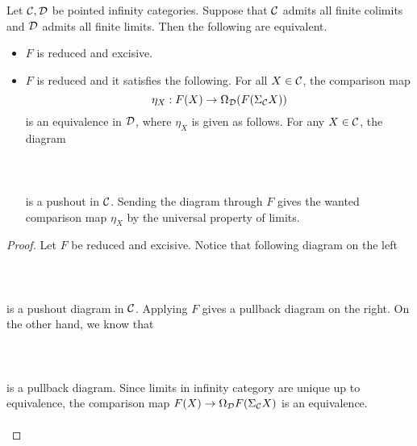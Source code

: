 \documentclass[a4paper]{article}
\begin{document}
\begin{prp}{}{} Let $\mathcal{C},\mathcal{D}$ be pointed infinity categories. Suppose that $\mathcal{C}$ admits all finite colimits and $\mathcal{D}$ admits all finite limits. Then the following are equivalent. 
\begin{itemize}
\item $F$ is reduced and excisive. 
\item $F$ is reduced and it satisfies the following. For all $X\in\mathcal{C}$, the comparison map $$\eta_X:F(X)\to\Omega_{\mathcal{D}}(F(\Sigma_{\mathcal{C}} X))$$ is an equivalence in $\mathcal{D}$, where $\eta_X$ is given as follows. For any $X\in\mathcal{C}$, the diagram \\~\\
\\~\\
is a pushout in $\mathcal{C}$. Sending the diagram through $F$ gives the wanted comparison map $\eta_X$ by the universal property of limits. 
\end{itemize} \tcbline
\begin{proof}
Let $F$ be reduced and excisive. Notice that following diagram on the left \\~\\
\\~\\
is a pushout diagram in $\mathcal{C}$. Applying $F$ gives a pullback diagram on the right. On the other hand, we know that \\~\\
\\~\\
is a pullback diagram. Since limits in infinity category are unique up to equivalence, the comparison map $F(X)\to\Omega_{\mathcal{D}} F(\Sigma_{\mathcal{C}} X)$ is an equivalence. \\~\\


\end{proof}
\end{prp}
\end{document}
